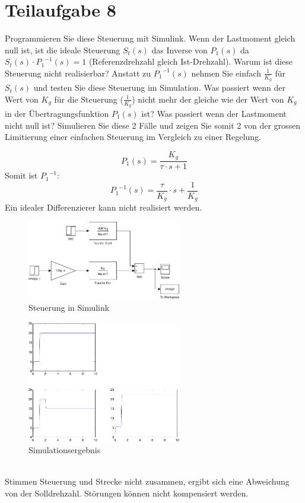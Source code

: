 \section{Teilaufgabe 8}
\begin{aufgabe}
    Programmieren Sie diese Steuerung mit Simulink. Wenn der Lastmoment gleich 
    null ist, ist die ideale Steuerung $S_t(s)$ das Inverse von $P_1(s)$ da 
    $S_t(s) \cdot {P_1}^{-1}(s) = 1$ (Referenzdrehzahl gleich Ist-Drehzahl). 
    Warum ist diese Steuerung nicht realisierbar? Anstatt zu ${P_1}^{-1}(s)$ 
    nehmen Sie einfach $\frac{1}{K_g}$ für $S_t(s)$ und testen Sie diese 
    Steuerung im Simulation.  Was passiert wenn der Wert von $K_g$ für die 
    Steuerung ($\frac{1}{K_g}$) nicht mehr der gleiche wie der Wert von $K_g$ 
    in der Übertragungsfunktion $P_1(s)$ ist? Was passiert wenn der Lastmoment 
    nicht null ist? Simulieren Sie diese 2 Fälle und zeigen Sie somit 2 von 
    der grossen Limitierung einer einfachen Steuerung im Vergleich zu einer 
    Regelung.
\end{aufgabe}
\[ P_1(s) = \frac{K_g}{\tau \cdot s + 1} \]
Somit ist ${P_1}^{-1}$:
\[ {P_1}^{-1}(s) = \frac{\tau}{K_g} \cdot s + \frac{1}{K_g} \]
Ein idealer Differenzierer kann nicht realisiert werden. 
\begin{figure}[h!]
    \centering
    \includegraphics[width=0.6\textwidth]{08/steuerung.pdf}
    \caption{Steuerung in Simulink}
    \label{fig:03}
\end{figure}
\begin{figure}[h!]
    \centering
    \includegraphics[width=0.6\textwidth]{08/steuerung_plot.pdf}
    \caption{Simulationsergebnis}
    \label{fig:08plot}
\end{figure}
\\
Stimmen Steuerung und Strecke nicht zusammen, ergibt sich eine Abweichung 
von der Solldrehzahl. Störungen können nicht kompensiert werden. 
